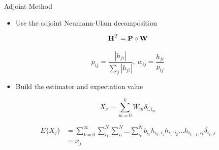 \documentclass{beamer}
\begin{document}
\begin{frame}{Adjoint Method}

  \begin{itemize}
  \item Use the adjoint Neumann-Ulam decomposition
  \end{itemize}

  \[
  \mathbf{H}^{T} = \mathbf{P} \circ \mathbf{W}
  \]

  \[
  p_{ij} = \frac{|h_{ji}|}{\sum_j |h_{ji}|},\ w_{ij} =
  \frac{h_{ji}}{p_{ij}}
  \]

  \medskip
  \begin{itemize}
  \item Build the estimator and expectation value
  \end{itemize}

  \[
  X_{\nu} = \sum_{m=0}^k W_{m} \delta_{i,i_m}
  \]

  \[
  \begin{split}
    E\{X_j\} &=\sum_{k=0}^{\infty}\sum_{i_1}^{N}\sum_{i_2}^{N}\ldots
    \sum_{i_k}^{N} b_{i_0} h_{i_0,i_1}h_{i_1,i_2}\ldots
    h_{i_{k-1},i_k} \delta_{i_k,j} \\ &= x_{j}
  \end{split}
  \]

\end{frame}
\end{document}

